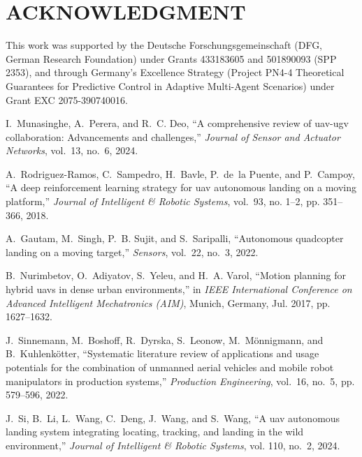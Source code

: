 \documentclass[conference,preprint]{IEEEtran}
\begin{document}
\section*{ACKNOWLEDGMENT}

This work was supported by the Deutsche Forschungsgemeinschaft (DFG, German Research Foundation) under Grants 433183605 and 501890093 (SPP 2353), and through Germany’s Excellence Strategy (Project PN4-4 Theoretical Guarantees for Predictive Control in Adaptive Multi-Agent Scenarios) under Grant EXC 2075-390740016.



\begin{thebibliography}{99}

  I.~Munasinghe, A.~Perera, and R.~C. Deo, ``A comprehensive review of uav-ugv
    collaboration: Advancements and challenges,'' \emph{Journal of Sensor and
    Actuator Networks}, vol.~13, no.~6, 2024.
  
  A.~Rodriguez-Ramos, C.~Sampedro, H.~Bavle, P.~de~la Puente, and P.~Campoy, ``A
    deep reinforcement learning strategy for uav autonomous landing on a moving
    platform,'' \emph{Journal of Intelligent \& Robotic Systems}, vol.~93, no.
    1–2, pp. 351--366, 2018.
  
  A.~Gautam, M.~Singh, P.~B. Sujit, and S.~Saripalli, ``Autonomous quadcopter
    landing on a moving target,'' \emph{Sensors}, vol.~22, no.~3, 2022.
  
  B.~Nurimbetov, O.~Adiyatov, S.~Yeleu, and H.~A. Varol, ``Motion planning for
    hybrid uavs in dense urban environments,'' in \emph{IEEE International
    Conference on Advanced Intelligent Mechatronics (AIM)}, Munich, Germany, Jul.
    2017, pp. 1627--1632.
  
  J.~Sinnemann, M.~Boshoff, R.~Dyrska, S.~Leonow, M.~Mönnigmann, and
    B.~Kuhlenkötter, ``Systematic literature review of applications and usage
    potentials for the combination of unmanned aerial vehicles and mobile robot
    manipulators in production systems,'' \emph{Production Engineering}, vol.~16,
    no.~5, pp. 579--596, 2022.
  
  J.~Si, B.~Li, L.~Wang, C.~Deng, J.~Wang, and S.~Wang, ``A uav autonomous
    landing system integrating locating, tracking, and landing in the wild
    environment,'' \emph{Journal of Intelligent \& Robotic Systems}, vol. 110,
    no.~2, 2024.
  

\end{thebibliography}
\end{document}
